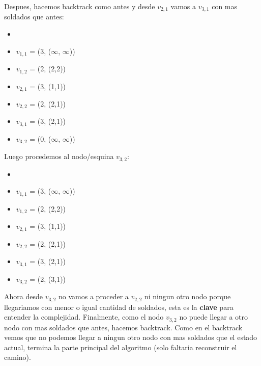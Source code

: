 Despues, hacemos backtrack como antes y desde $v_{2,1}$ vamos a $v_{3,1}$ con mas soldados que antes:

\begin{multicols}{2}
\columnbreak
\columnbreak
  \begin{itemize}[noitemsep]
      \item[]
      \item $v_{1,1}$ = (3, ($\infty$, $\infty$))
      \item $v_{1,2}$ = (2, (2,2))
      \item $v_{2,1}$ = (3, (1,1))
      \item $v_{2,2}$ = (2, (2,1))
      \item $v_{3,1}$ = (3, (2,1))
      \item $v_{3,2}$ = (0, ($\infty$, $\infty$))
    \end{itemize}
\end{multicols}

Luego procedemos al nodo/esquina $v_{3,2}$:


\begin{multicols}{2}
\columnbreak
\columnbreak
  \begin{itemize}[noitemsep]
      \item[]
      \item $v_{1,1}$ = (3, ($\infty$, $\infty$))
      \item $v_{1,2}$ = (2, (2,2))
      \item $v_{2,1}$ = (3, (1,1))
      \item $v_{2,2}$ = (2, (2,1))
      \item $v_{3,1}$ = (3, (2,1))
      \item $v_{3,2}$ = (2, (3,1))
    \end{itemize}
\end{multicols}

Ahora desde $v_{3,2}$ no vamos a proceder a $v_{2,2}$ ni ningun otro nodo porque llegariamos con menor o igual cantidad de soldados, esta es la \textbf{clave} para entender la complejidad.
Finalmente, como el nodo $v_{3,2}$ no puede llegar a otro nodo con mas soldados que antes, hacemos backtrack. Como en el backtrack vemos que no podemos llegar a ningun otro nodo con mas soldados que el estado actual, termina la parte principal del algoritmo (solo faltaria reconstruir el camino).

